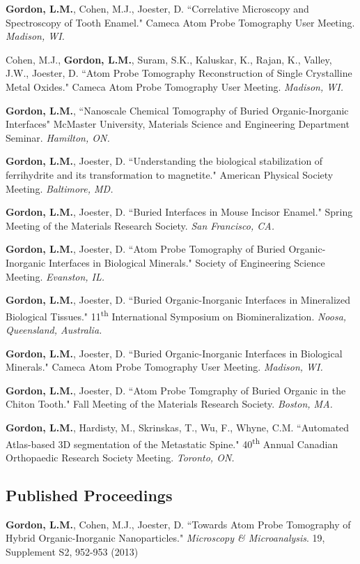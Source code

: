 \textbf{Gordon, L.M.}, Cohen, M.J., Joester, D. ``Correlative Microscopy and Spectroscopy of Tooth Enamel." Cameca Atom Probe Tomography User Meeting. \emph{Madison, WI.}

Cohen, M.J., \textbf{Gordon, L.M.}, Suram, S.K., Kaluskar, K., Rajan, K., Valley, J.W., Joester, D. ``Atom Probe Tomography Reconstruction of Single Crystalline Metal Oxides." Cameca Atom Probe Tomography User Meeting. \emph{Madison, WI.}

\textbf{Gordon, L.M.}, ``Nanoscale Chemical Tomography of Buried Organic-Inorganic Interfaces" McMaster University, Materials Science and Engineering Department Seminar. \emph{Hamilton, ON.}

\textbf{Gordon, L.M.}, Joester, D. ``Understanding the biological stabilization of ferrihydrite and its transformation to magnetite." American Physical Society Meeting. \emph{Baltimore, MD.}

\textbf{Gordon, L.M.}, Joester, D. ``Buried Interfaces in Mouse Incisor Enamel." Spring Meeting of the Materials Research Society. \emph{San Francisco, CA.}

\textbf{Gordon, L.M.}, Joester, D. ``Atom Probe Tomography of Buried Organic-Inorganic Interfaces in Biological Minerals." Society of Engineering Science Meeting. \emph{Evanston, IL.}

\textbf{Gordon, L.M.}, Joester, D. ``Buried Organic-Inorganic Interfaces in Mineralized Biological Tissues." 11\textsuperscript{th} International Symposium on Biomineralization. \emph{Noosa, Queensland, Australia.}

\textbf{Gordon, L.M.}, Joester, D. ``Buried Organic-Inorganic Interfaces in Biological Minerals." Cameca Atom Probe Tomography User Meeting. \emph{Madison, WI.}

\textbf{Gordon, L.M.}, Joester, D. ``Atom Probe Tomgraphy of Buried Organic in the Chiton Tooth." Fall Meeting of the Materials Research Society. \emph{Boston, MA.}

\textbf{Gordon, L.M.}, Hardisty, M., Skrinskas, T., Wu, F., Whyne, C.M. ``Automated Atlas-based 3D segmentation of the Metastatic Spine." 40\textsuperscript{th} Annual Canadian Orthopaedic Research Society Meeting. \emph{Toronto, ON.}
\endgroup

\subsection*{Published Proceedings}
\textbf{Gordon, L.M.}, Cohen, M.J., Joester, D. ``Towards Atom Probe Tomography of Hybrid Organic-Inorganic Nanoparticles." \emph{Microscopy \& Microanalysis}. 19, Supplement S2, 952-953 (2013)
\begingroup\setlength{\parskip}{0.15cm}

